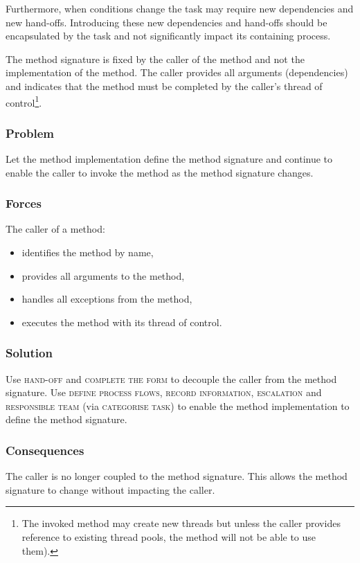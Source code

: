 \documentclass[prodmode]{style/acmlarge}
\begin{document}
Furthermore, when conditions change the task may require new dependencies and
new hand-offs.  Introducing these new dependencies and hand-offs should be
encapsulated by the task and not significantly impact its containing process.

The method signature is fixed by the caller of the method and not the
implementation of the method.  The caller provides all arguments (dependencies)
and indicates that the method must be completed by the caller's thread of
control\footnote{The invoked method may create new threads but unless the caller
provides reference to existing thread pools, the method will not be able to use
them).}.

\subsubsection*{Problem} Let the method implementation define the method
signature and continue to enable the caller to invoke the method as the method
signature changes.

\subsubsection*{Forces} The caller of a method:
\begin{itemize}
  \item identifies the method by name,
  \item provides all arguments to the method,
  \item handles all exceptions from the method,
  \item executes the method with its thread of control.
\end{itemize}

\subsubsection*{Solution} Use \textsc{hand-off} and \textsc{complete the form}
to decouple the caller from the method signature.  Use \textsc{define
process flows}, \textsc{record information}, \textsc{escalation} and
\textsc{responsible team} (via \textsc{categorise task}) to enable the method
implementation to define the method signature.

\subsubsection*{Consequences} The caller is no longer coupled to the method
signature.  This allows the method signature to change without impacting the
caller.
\end{document}
